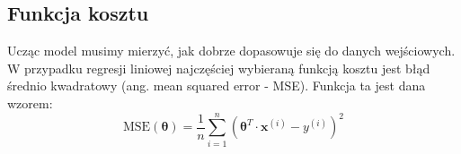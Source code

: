 \documentclass{article}
\begin{document}
\subsection{Funkcja kosztu}

Ucząc model musimy mierzyć, jak dobrze dopasowuje się do danych wejściowych. W przypadku regresji liniowej najczęściej wybieraną funkcją kosztu jest błąd średnio kwadratowy (ang. mean squared error - MSE). Funkcja ta jest dana wzorem: 
\begin{equation}
    \text{MSE}(\bm{\theta}) = \frac{1}{n}\sum_{i = 1}^{n}(\bm{\theta}^T\cdot\bm{x}^{(i)} - y^{(i)})^2
\end{equation}

\end{document}
